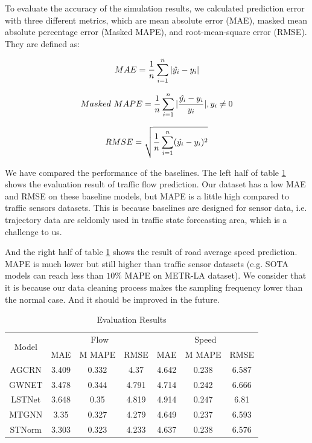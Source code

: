 \documentclass[fontset=none]{ctexart}
\theoremstyle{definition}
\theoremstyle{remark}
\begin{document}
To evaluate the accuracy of the simulation
results, we calculated prediction error with three different
metrics, which are mean absolute error (MAE),
masked mean absolute percentage error (Masked MAPE), and root-mean-square error
(RMSE). They are defined as:

\begin{equation}
  MAE=\frac 1n\sum_{i=1}^n|\hat{y_i}-y_i|\notag
\end{equation}

\begin{equation}
  Masked\ MAPE=\frac 1n\sum_{i=1}^n|\frac{\hat{y_i}-y_i}{y_i}|, y_i\neq 0 \notag
\end{equation}

\begin{equation}
  RMSE=\sqrt{\frac 1n\sum_{i=1}^n(\hat{y_i}-y_i)^2}\notag
\end{equation}

We have compared the performance of the baselines.
The left half of table \ref{tab: eval} shows the evaluation result of traffic flow prediction.
Our dataset has a low MAE and RMSE on these baseline models, but MAPE is a little high
compared to traffic sensors datasets. This is because baselines are designed for sensor data,
i.e. trajectory data are seldomly used in traffic state forecasting area, which is a challenge to us.

And the right half of table \ref{tab: eval} shows the result of road average speed prediction. MAPE is much lower but still
higher than traffic sensor datasets (e.g. SOTA models can reach less than $10\%$ MAPE on METR-LA dataset).
We consider that it is because our data cleaning process makes the sampling frequency lower than the normal case.
And it should be improved in the future.

\begin{table}[htb]
  \centering
  \begin{tabular}{c|c|c|c||c|c|c}
  \hline\hline
      \multirow{2}{*}{Model} & \multicolumn{3}{c||}{Flow} & \multicolumn{3}{c}{Speed} \\ \cline{2-7}
      ~ & MAE & M MAPE & RMSE & MAE & M MAPE & RMSE \\ \hline
      AGCRN & 3.409 & 0.332 & 4.37 & 4.642 & 0.238 & 6.587 \\
      GWNET & 3.478 & 0.344 & 4.791 & 4.714 & 0.242 & 6.666 \\
      LSTNet & 3.648 & 0.35 & 4.819 & 4.914 & 0.247 & 6.81 \\
      MTGNN & 3.35 & 0.327 & 4.279 & 4.649 & 0.237 & 6.593 \\
      STNorm & 3.303 & 0.323 & 4.233 & 4.637 & 0.238 & 6.576 \\ \hline
  \end{tabular}
  \caption{Evaluation Results}
  \label{tab: eval}
\end{table}

\clearpage
{}
{}


\end{document}
